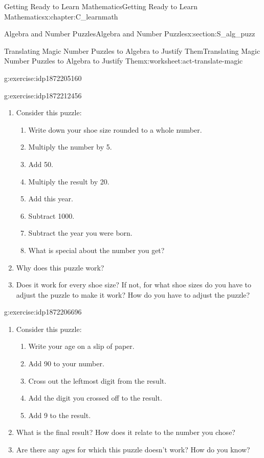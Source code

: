 \documentclass[oneside,10pt,]{book}
\numberwithin{equation}{chapter}
\begin{document}
\begin{chapterptx}{Getting Ready to Learn Mathematics}{}{Getting Ready to Learn Mathematics}{}{}{x:chapter:C_learnmath}
\begin{sectionptx}{Algebra and Number Puzzles}{}{Algebra and Number Puzzles}{}{}{x:section:S_alg_puzz}
\begin{worksheet-subsection}{Translating Magic Number Puzzles to Algebra to Justify Them}{}{Translating Magic Number Puzzles to Algebra to Justify Them}{}{}{x:worksheet:act-translate-magic}
\begin{divisionexercise}{1}{}{}{g:exercise:idp1872205160}
\begin{enumerate}[font=\bfseries,label=(\alph*),ref=\alph*]
\end{enumerate}
\end{divisionexercise}%
\begin{divisionexercise}{2}{}{}{g:exercise:idp1872212456}%
\begin{enumerate}[font=\bfseries,label=(\alph*),ref=\alph*]
\item{}Consider this puzzle:%
\begin{enumerate}[label=(\alph*)]
\item{}Write down your shoe size rounded to a whole number.%
\item{}Multiply the number by 5.%
\item{}Add 50.%
\item{}Multiply the result by 20.%
\item{}Add this year.%
\item{}Subtract 1000.%
\item{}Subtract the year you were born.%
\item{}What is special about the number you get?%
\end{enumerate}
%
\item{}Why does this puzzle work?%
\item{}Does it work for every shoe size? If not, for what shoe sizes do you have to adjust the puzzle to make it work? How do you have to adjust the puzzle?%
\end{enumerate}
\end{divisionexercise}%
\begin{divisionexercise}{3}{}{}{g:exercise:idp1872206696}%
\begin{enumerate}[font=\bfseries,label=(\alph*),ref=\alph*]
\item{}Consider this puzzle:%
\begin{enumerate}[label=(\alph*)]
\item{}Write your age on a slip of paper.%
\item{}Add 90 to your number.%
\item{}Cross out the leftmost digit from the result.%
\item{}Add the digit you crossed off to the result.%
\item{}Add 9 to the result.%
\end{enumerate}
%
\item{}What is the final result? How does it relate to the number you chose?%
\item{}Are there any ages for which this puzzle doesn't work? How do you know?%
\end{enumerate}

\end{divisionexercise}
\end{worksheet-subsection}
\end{sectionptx}
\end{chapterptx}
\end{document}
